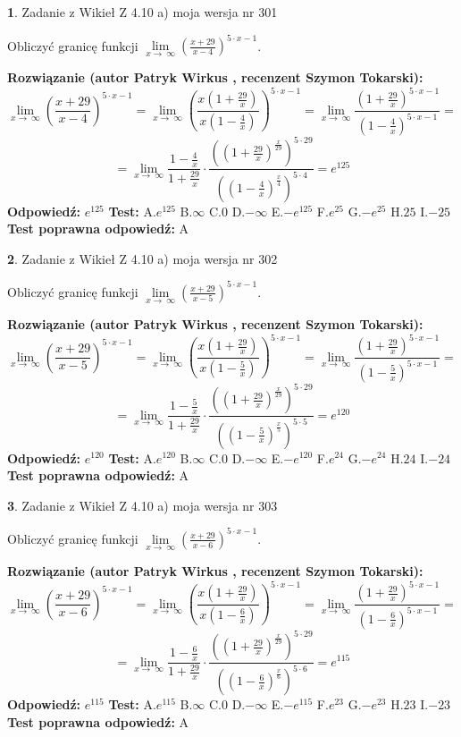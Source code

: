 \documentclass[12pt, a4paper]{article}
\theoremstyle{definition} %
\newtheorem{zad}{}
\newcommand{\zadStart}[1]{\begin{zad}#1\newline}
\newcommand{\zadStop}{\end{zad}}
\newcommand{\rozwStart}[2]{\noindent \textbf{Rozwiązanie (autor #1 , recenzent #2): }\newline}
\newcommand{\rozwStop}{\newline}
\newcommand{\odpStart}{\noindent \textbf{Odpowiedź:}\newline}
\newcommand{\odpStop}{\newline}
\newcommand{\testStart}{\noindent \textbf{Test:}\newline}
\newcommand{\testStop}{\newline}
\newcommand{\kluczStart}{\noindent \textbf{Test poprawna odpowiedź:}\newline}
\newcommand{\kluczStop}{\newline}
\begin{document}
\zadStart{Zadanie z Wikieł Z 4.10 a) moja wersja nr 301}

Obliczyć granicę funkcji  $\lim\limits_{x\to\ \infty}(\frac{x+29}{x-4})^{5\cdot x-1}$.
\zadStop
\rozwStart{Patryk Wirkus}{Szymon Tokarski}
$$\lim\limits_{x\to\ \infty}(\frac{x+29}{x-4})^{5\cdot x-1} = \lim\limits_{x\to\ \infty}(\frac{x(1+\frac{29}{x})}{x(1-\frac{4}{x})})^{5\cdot x-1}=\lim\limits_{x\to\ \infty}\frac{(1+\frac{29}{x})^{5\cdot x-1}}{(1-\frac{4}{x})^{5\cdot x-1}}=$$
$$=\lim\limits_{x\to\ \infty}\frac{1-\frac{4}{x}}{1+\frac{29}{x}}\cdot\frac{((1+\frac{29}{x})^{\frac{x}{29}})^{5\cdot29}}{((1-\frac{4}{x})^{\frac{x}{4}})^{5\cdot4}}=e^{125}$$
\rozwStop
\odpStart
$e^{125}$
\odpStop
\testStart
A.$e^{125}$ B.$\infty$ C.$0$ D.$-\infty$ E.$-e^{125}$
F.$e^{25}$ G.$-e^{25}$
H.$25$
I.$-25$
\testStop
\kluczStart
A
\kluczStop



\zadStart{Zadanie z Wikieł Z 4.10 a) moja wersja nr 302}

Obliczyć granicę funkcji  $\lim\limits_{x\to\ \infty}(\frac{x+29}{x-5})^{5\cdot x-1}$.
\zadStop
\rozwStart{Patryk Wirkus}{Szymon Tokarski}
$$\lim\limits_{x\to\ \infty}(\frac{x+29}{x-5})^{5\cdot x-1} = \lim\limits_{x\to\ \infty}(\frac{x(1+\frac{29}{x})}{x(1-\frac{5}{x})})^{5\cdot x-1}=\lim\limits_{x\to\ \infty}\frac{(1+\frac{29}{x})^{5\cdot x-1}}{(1-\frac{5}{x})^{5\cdot x-1}}=$$
$$=\lim\limits_{x\to\ \infty}\frac{1-\frac{5}{x}}{1+\frac{29}{x}}\cdot\frac{((1+\frac{29}{x})^{\frac{x}{29}})^{5\cdot29}}{((1-\frac{5}{x})^{\frac{x}{5}})^{5\cdot5}}=e^{120}$$
\rozwStop
\odpStart
$e^{120}$
\odpStop
\testStart
A.$e^{120}$ B.$\infty$ C.$0$ D.$-\infty$ E.$-e^{120}$
F.$e^{24}$ G.$-e^{24}$
H.$24$
I.$-24$
\testStop
\kluczStart
A
\kluczStop



\zadStart{Zadanie z Wikieł Z 4.10 a) moja wersja nr 303}

Obliczyć granicę funkcji  $\lim\limits_{x\to\ \infty}(\frac{x+29}{x-6})^{5\cdot x-1}$.
\zadStop
\rozwStart{Patryk Wirkus}{Szymon Tokarski}
$$\lim\limits_{x\to\ \infty}(\frac{x+29}{x-6})^{5\cdot x-1} = \lim\limits_{x\to\ \infty}(\frac{x(1+\frac{29}{x})}{x(1-\frac{6}{x})})^{5\cdot x-1}=\lim\limits_{x\to\ \infty}\frac{(1+\frac{29}{x})^{5\cdot x-1}}{(1-\frac{6}{x})^{5\cdot x-1}}=$$
$$=\lim\limits_{x\to\ \infty}\frac{1-\frac{6}{x}}{1+\frac{29}{x}}\cdot\frac{((1+\frac{29}{x})^{\frac{x}{29}})^{5\cdot29}}{((1-\frac{6}{x})^{\frac{x}{6}})^{5\cdot6}}=e^{115}$$
\rozwStop
\odpStart
$e^{115}$
\odpStop
\testStart
A.$e^{115}$ B.$\infty$ C.$0$ D.$-\infty$ E.$-e^{115}$
F.$e^{23}$ G.$-e^{23}$
H.$23$
I.$-23$
\testStop
\kluczStart
A
\kluczStop
\end{document}
